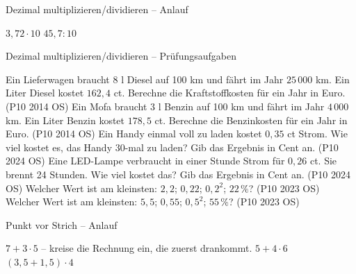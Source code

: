 \begin{aufgabe}{Dezimal multiplizieren/dividieren – Anlauf}
\begin{teile}
\teil $3{,}72 \cdot 10$
\teil $45{,}7 : 10$
\end{teile}
\end{aufgabe}

\begin{aufgabe}{Dezimal multiplizieren/dividieren – Prüfungsaufgaben}
\begin{teile}
\teil Ein Lieferwagen braucht 8 l Diesel auf 100 km und fährt im Jahr $25\,000$ km. Ein Liter Diesel kostet $162{,}4$ ct. Berechne die Kraftstoffkosten für ein Jahr in Euro. \hfill (P10 2014 OS)
\teil Ein Mofa braucht 3 l Benzin auf 100 km und fährt im Jahr $4\,000$ km. Ein Liter Benzin kostet $178{,}5$ ct. Berechne die Benzinkosten für ein Jahr in Euro. \hfill (P10 2014 OS)
\teil Ein Handy einmal voll zu laden kostet $0{,}35$ ct Strom. Wie viel kostet es, das Handy 30-mal zu laden? Gib das Ergebnis in Cent an. \hfill (P10 2024 OS)
\teil Eine LED-Lampe verbraucht in einer Stunde Strom für $0{,}26$ ct. Sie brennt 24 Stunden. Wie viel kostet das? Gib das Ergebnis in Cent an. \hfill (P10 2024 OS)
\teil Welcher Wert ist am kleinsten: $2{,}2$; $0{,}22$; $0{,}2^2$; $22\,\%$? \hfill (P10 2023 OS) \\ \leerfeld
\teil Welcher Wert ist am kleinsten: $5{,}5$; $0{,}55$; $0{,}5^2$; $55\,\%$? \hfill (P10 2023 OS) \\ \leerfeld
\end{teile}
\end{aufgabe}

\begin{aufgabe}{Punkt vor Strich – Anlauf}
\begin{teile}
\teil $7 + 3 \cdot 5$ – kreise die Rechnung ein, die zuerst drankommt.
\teil $5 + 4 \cdot 6$
\teil $(3{,}5 + 1{,}5) \cdot 4$
\end{teile}
\end{aufgabe}

